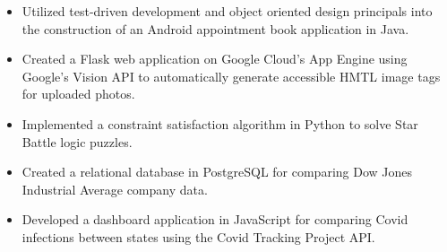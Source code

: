\documentclass[11pt]{article}
\begin{document}
\begin{itemize}[leftmargin=*, itemsep=0pt, topsep=5pt]
	\item Utilized test-driven development and object oriented design principals into the construction of an Android appointment book application in Java.
	\item Created a Flask web application on Google Cloud’s App Engine using Google’s Vision API to automatically generate accessible HMTL image tags for uploaded photos.
	\item Implemented a constraint satisfaction algorithm in Python to solve Star Battle logic puzzles.
	\item Created a relational database in PostgreSQL for comparing Dow Jones Industrial Average company data.
	\item Developed a dashboard application in JavaScript for comparing Covid infections between states using the Covid Tracking Project API.
\end{itemize} 
\smallskip
\end{document}
